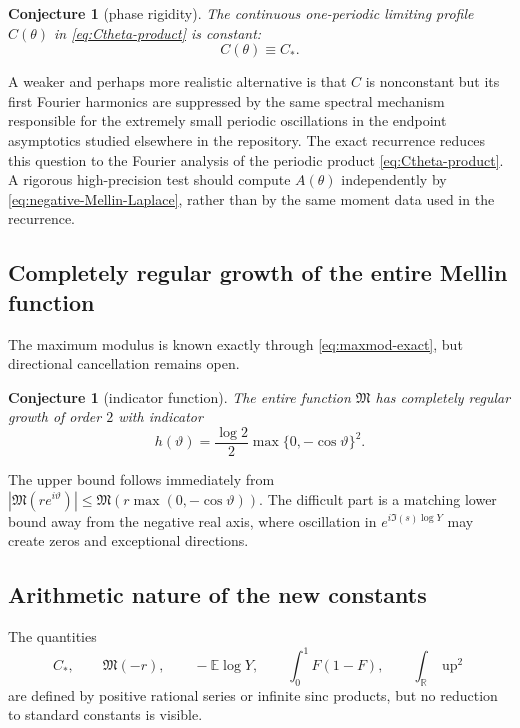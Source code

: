 \documentclass[11pt,oneside]{article}
\newtheorem{conjecture}[theorem]{Conjecture}
\theoremstyle{definition}
\newcommand{\F}{F}
\newcommand{\upf}{\operatorname{up}}
\newcommand{\M}{\mathfrak M}
\newcommand{\E}{\mathbb E}
\newcommand{\R}{\mathbb R}
\begin{document}
\begin{conjecture}[phase rigidity]\label{conj:phase-constant}
The continuous one-periodic limiting profile \(C(\theta)\) in
\cref{eq:Ctheta-product} is constant:
\begin{equation}\label{eq:Ctheta-conjecture}
 C(\theta)\equiv C_*.
\end{equation}
\end{conjecture}

A weaker and perhaps more realistic alternative is that \(C\) is nonconstant but its
first Fourier harmonics are suppressed by the same spectral mechanism responsible for
the extremely small periodic oscillations in the endpoint asymptotics studied elsewhere
in the repository.  The exact recurrence reduces this question to the Fourier analysis
of the periodic product \cref{eq:Ctheta-product}.  A rigorous high-precision
test should compute \(A(\theta)\) independently by \cref{eq:negative-Mellin-Laplace},
rather than by the same moment data used in the recurrence.

\subsection{Completely regular growth of the entire Mellin function}

The maximum modulus is known exactly through \cref{eq:maxmod-exact}, but directional
cancellation remains open.

\begin{conjecture}[indicator function]\label{conj:indicator}
The entire function \(\M\) has completely regular growth of order \(2\) with indicator
\begin{equation}\label{eq:indicator-conjecture}
 h(\vartheta)=\frac{\log2}{2}
 \max\{0,-\cos\vartheta\}^2.
\end{equation}
\end{conjecture}

The upper bound follows immediately from
\(|\M(re^{i\vartheta})|\le\M(r\max(0,-\cos\vartheta))\).  The difficult part is a
matching lower bound away from the negative real axis, where oscillation in
\(e^{i\Im(s)\log Y}\) may create zeros and exceptional directions.

\subsection{Arithmetic nature of the new constants}

The quantities
\begin{equation}\label{eq:new-constants}
 C_*,\qquad \M(-r),\qquad -\E\log Y,
 \qquad \int_0^1\F(1-\F),\qquad \int_\R\upf^2
\end{equation}
are defined by positive rational series or infinite sinc products, but no reduction to
standard constants is visible.
\end{document}

